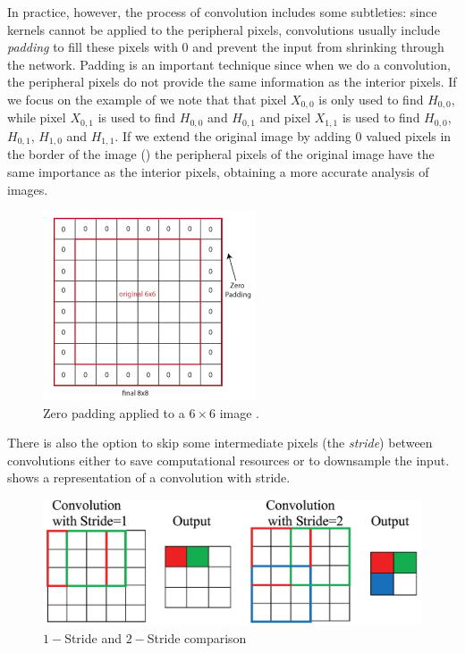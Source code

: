 In practice, however, the process of convolution includes some subtleties: since kernels cannot be applied to the peripheral pixels, convolutions usually include \textit{padding} to fill these pixels with \( 0 \) and prevent the input from shrinking through the network. Padding is an important technique since when we do a convolution, the peripheral pixels do not provide the same information as the interior pixels. If we focus on the example of  we note that that pixel $X_{0,0}$ is only used to find $H_{0,0}$, while pixel $X_{0,1}$ is used to find $H_{0,0}$ and $H_{0,1}$ and pixel $X_{1,1}$ is used to find $H_{0,0}$, $H_{0,1}$, $H_{1,0}$ and $H_{1,1}$. If we extend the original image by adding 0 valued pixels in the border of the image () the peripheral pixels of the original image have the same importance as the interior pixels, obtaining a more accurate analysis of images. 
\begin{figure}[tb]
    \centering
    \includegraphics[width=.5\textwidth]{figures/chapter2/zeropadding.png}
    \caption{Zero padding applied to a $6\times 6$ image \cite{paddingImg}.}
    \label{fig:padding}
\end{figure}

There is also the option to skip some intermediate pixels (the \textit{stride}) between convolutions either to save computational resources or to downsample the input.  shows a representation of a convolution with stride.
\begin{figure}[tb]
    \centering
    \includegraphics[width=\textwidth]{figures/chapter2/stride.jpg}
    \caption{$1-$Stride and $2-$Stride comparison \cite{strideImg}}
    \label{fig:Stride}
\end{figure}

